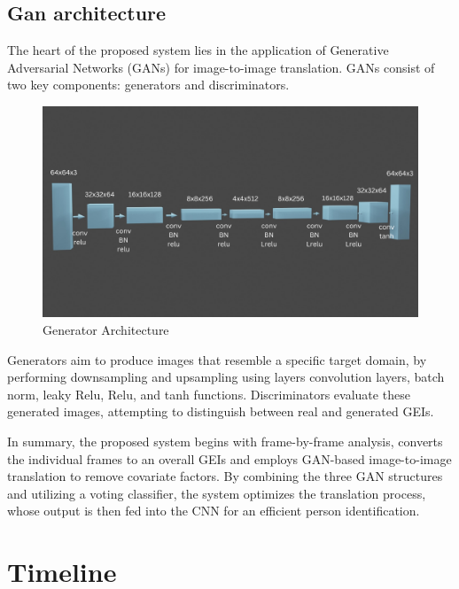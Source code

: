 \documentclass[12pt,a4paper]{article}
\begin{document}

\subsection{Gan architecture}
The heart of the proposed system lies in the application of Generative Adversarial Networks (GANs) for image-to-image translation. GANs consist of two key components: generators and discriminators. 
\begin{figure}[!h]
  \centering
\includegraphics[scale = 0.35]{images/gen.png}
  \caption{Generator Architecture}
  \label{fig: Gen architecture}
\end{figure}
Generators aim to produce images that resemble a specific target domain, by performing downsampling and upsampling using layers convolution layers, batch norm, leaky Relu, Relu, and tanh functions. Discriminators evaluate these generated images, attempting to distinguish between real and generated GEIs.
\newline

In summary, the proposed system begins with frame-by-frame analysis, converts the individual frames to an overall GEIs and employs GAN-based image-to-image translation to remove covariate factors. By combining the three GAN structures and utilizing a voting classifier, the system optimizes the translation process, whose output is then fed into the CNN for an efficient person identification.
\clearpage
\section{Timeline}
\end{document}
